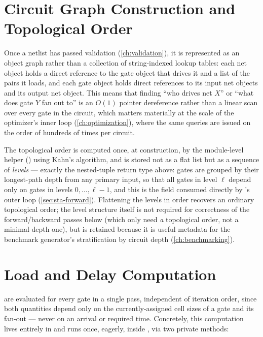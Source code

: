 \section{Circuit Graph Construction and Topological Order}
\label{sec:sta-graph}

Once a netlist has passed validation (\cref{ch:validation}), it is
represented as an object graph rather than a collection of string-indexed
lookup tables: each net object holds a direct reference to the gate object
that drives it and a list of the  pairs it loads,
and each gate object holds direct references to its input net objects and
its output net object. This means that finding ``who drives net $X$'' or
``what does gate $Y$ fan out to'' is an $O(1)$ pointer dereference rather
than a linear scan over every gate in the circuit, which matters
materially at the scale of the optimizer's inner loop
(\cref{ch:optimization}), where the same queries are issued on the order of
hundreds of times per circuit.

The topological order is computed once, at  construction, by
the module-level helper  () using Kahn's
algorithm, and is stored not as a flat list but as a sequence of
\emph{levels} --- exactly the nested-tuple return type above: gates are
grouped by their longest-path depth from any
primary input, so that all gates in level $\ell$ depend only on gates in
levels $0, \ldots, \ell-1$, and this is the 
field consumed directly by 's outer
 loop (\cref{sec:sta-forward}). Flattening the levels in order recovers an
ordinary topological order; the level structure itself is not required for
correctness of the forward/backward passes below (which only need \emph{a}
topological order, not a minimal-depth one), but is retained because it is
useful metadata for the benchmark generator's stratification by circuit
depth (\cref{ch:benchmarking}).

\section{Load and Delay Computation}
\label{sec:sta-load}

 are evaluated for every gate in a single
pass, independent of iteration order, since both quantities depend only on
the currently-assigned cell sizes of a gate and its fan-out --- never on an
arrival or required time. Concretely, this computation lives entirely in
 and runs once, eagerly, inside
, via two private methods:

